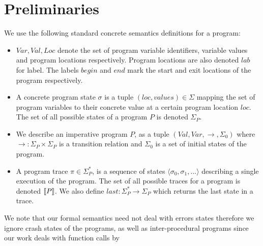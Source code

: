 \section{Preliminaries} 
We use the following standard concrete semantics definitions for a program:
\begin{itemize}
\item $Var,Val,Loc$ denote the set of program variable identifiers, variable values and program locations respectively. Program locations are also denoted $lab$ for label. The labels $begin$ and $end$ mark the start and exit locations of the program respectively.
\item A concrete program state $\sigma$ is a tuple $(loc, values) \in \Sigma$ mapping the set of program variables to their concrete value at a certain program location $loc$. The set of all possible states of a program $P$ is denoted $\Sigma_{P}$.
\item We describe an imperative program $P$, as a tuple $(Val,Var,\rightarrow,\Sigma_{0})$ where $\rightarrow : \Sigma_{P} \times \Sigma_{P} $  is a transition relation and $\Sigma_{0}$ is a set of initial states of the program.
\item A program trace $\pi \in \Sigma^*_{P}$, is a sequence of states $\langle \sigma_0,\sigma_1,... \rangle$ describing a single execution of the program. The set of all possible traces for a program is denoted $\lbrack\!\lbrack P \rbrack\!\rbrack$. We also define $last : \Sigma_{P}^* \rightarrow \Sigma_{P}$ which returns the last state in a trace.
\end{itemize}

%

\begin{sloppypar}
We note that our formal semantics need not deal with errors states therefore we ignore crash states of the programs, as well as inter-procedural programs since our work deals with function calls by 
\end{sloppypar}

